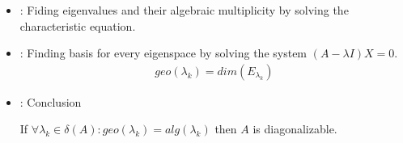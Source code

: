     \begin{itemize}
      \item {}: Fiding eigenvalues and their algebraic multiplicity
        by solving the characteristic equation.
      \item {}: Finding basis for every eigenspace by solving the
        system $(A - \lambda I) X = 0$.
        \begin{align*}
          geo(\lambda_{k}) = dim(E_{\lambda_{k}})
        \end{align*}
      \item {}: Conclusion
        \par If $\forall \lambda_{k} \in \delta(A):
          geo(\lambda_{k}) = alg(\lambda_{k})$ then $A$ is diagonalizable.
    \end{itemize}

